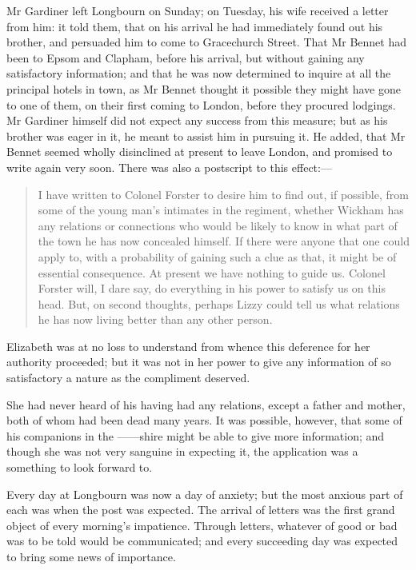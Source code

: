 Mr Gardiner left Longbourn on Sunday; on Tuesday, his wife received a letter from him: it told them, that on his arrival he had immediately found out his brother, and persuaded him to come to Gracechurch Street. That Mr Bennet had been to Epsom and Clapham, before his arrival, but without gaining any satisfactory information; and that he was now determined to inquire at all the principal hotels in town, as Mr Bennet thought it possible they might have gone to one of them, on their first coming to London, before they procured lodgings. Mr Gardiner himself did not expect any success from this measure; but as his brother was eager in it, he meant to assist him in pursuing it. He added, that Mr Bennet seemed wholly disinclined at present to leave London, and promised to write again very soon. There was also a postscript to this effect:—

\begin{quote}
I have written to Colonel Forster to desire him to find out, if possible, from some of the young man's intimates in the regiment, whether Wickham has any relations or connections who would be likely to know in what part of the town he has now concealed himself. If there were anyone that one could apply to, with a probability of gaining such a clue as that, it might be of essential consequence. At present we have nothing to guide us. Colonel Forster will, I dare say, do everything in his power to satisfy us on this head. But, on second thoughts, perhaps Lizzy could tell us what relations he has now living better than any other person.
\end{quote}

Elizabeth was at no loss to understand from whence this deference for her authority proceeded; but it was not in her power to give any information of so satisfactory a nature as the compliment deserved.

She had never heard of his having had any relations, except a father and mother, both of whom had been dead many years. It was possible, however, that some of his companions in the ——shire might be able to give more information; and though she was not very sanguine in expecting it, the application was a something to look forward to.

Every day at Longbourn was now a day of anxiety; but the most anxious part of each was when the post was expected. The arrival of letters was the first grand object of every morning's impatience. Through letters, whatever of good or bad was to be told would be communicated; and every succeeding day was expected to bring some news of importance.

